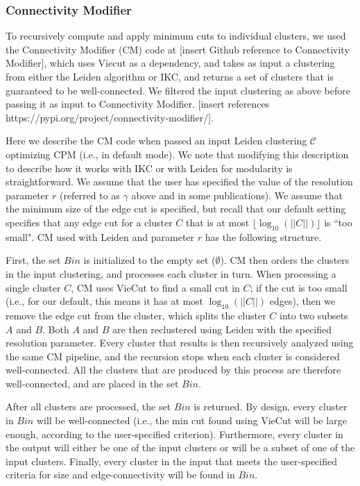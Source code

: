 \documentclass[a4paper]{article}   	%
\begin{document}
\subsubsection{Connectivity Modifier} To recursively compute and apply minimum cuts to individual clusters, we used the Connectivity Modifier (CM) code at [insert Github reference to Connectivity Modifier], which uses Viecut \citep{Henzinger2018,Henzinger2019} as a dependency, and takes as input a clustering from either the Leiden algorithm or IKC, and returns a set of clusters that is guaranteed to be
well-connected.
We filtered the input clustering as above before passing it as input to Connectivity Modifier. [insert references https://pypi.org/project/connectivity-modifier/].

Here we describe the CM code when passed an input  Leiden clustering $\mathcal{C}$  optimizing CPM (i.e., in default mode). We note that modifying this description to describe how it works with IKC or with Leiden for modularity is straightforward.
We assume that the user has specified the value of the resolution parameter $r$ (referred to as $\gamma$ above and in some publications).
We assume that the minimum size of the edge cut is specified, but recall that our default setting specifies that any edge cut for a cluster $C$ that is at most $ \lfloor \log_{10}(||C||) \rfloor$ is ``too small".
CM used with Leiden and parameter $r$ has the following structure.


First, the set $Bin$ is initialized to the empty set  ($\emptyset$).
CM  then orders the clusters in the input clustering, and   processes each cluster in  turn.
When processing a single cluster $C$,
CM uses VieCut to find a small cut in $C$;  if the cut is too small (i.e., for our default, this means it has at most $\log_{10}(||C||)$ edges), then
we remove the edge cut from the cluster, which splits the cluster $C$ into two  subsets $A$ and $B$.
Both $A$ and $B$ are then reclustered using Leiden with the specified resolution parameter.
Every cluster that results is then recursively analyzed using the same CM pipeline, and the recursion stops when each cluster is considered well-connected.
All the clusters that are produced by this process are therefore well-connected, and are placed in the set $Bin$.

After all clusters are processed, the set $Bin$ is returned.
By design, every cluster in  $Bin$ will be well-connected (i.e., the min cut found using VieCut will be large enough, according to the user-specified criterion).
Furthermore, every cluster in the output will either be one of the input clusters or will be a subset of one of the input clusters.
Finally, every cluster in the input that meets the user-specified criteria for size and edge-connectivity will be found in $Bin$.
\end{document}
